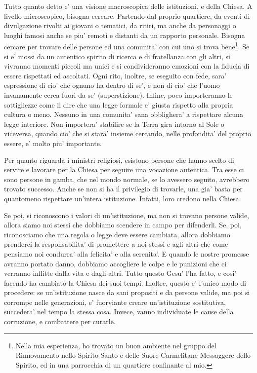 Tutto quanto detto e' una visione macroscopica delle istituzioni, e della Chiesa. A livello microscopico, bisogna cercare. Partendo dal proprio quartiere, da eventi di divulgazione rivolti ai giovani o tematici, da ritiri, ma anche da personaggi o luoghi famosi anche se piu' remoti e distanti da un rapporto personale. Bisogna cercare per trovare delle persone ed una comunita' con cui uno si trova bene\footnote{
    Nella mia esperienza, ho trovato un buon ambiente nel gruppo del Rinnovamento nello Spirito Santo e delle Suore Carmelitane Messaggere dello Spirito, ed in una parrocchia di un quartiere confinante al mio.
}.
Se si e' mossi da un autentico spirito di ricerca e di fratellanza con gli altri, si vivranno momenti piccoli ma unici e si condivideranno emozioni con la fiducia di essere rispettati ed ascoltati. Ogni rito, inoltre, se eseguito con fede, sara' espressione di cio' che ognuno ha dentro di se', e non di cio' che l'uomo invanamente cerca fuori da se' (superstizione). Infine, poco importeranno le sottigliezze come il dire che una legge formale e' giusta rispetto alla propria cultura o meno. Nessuno in una comunita' sana obblighera' a rispettare alcuna legge interiore. Non importera' stabilire se la Terra gira intorno al Sole o viceversa, quando cio' che si stara' insieme cercando, nelle profondita' del proprio essere, e' molto piu' importante.

Per quanto riguarda i ministri religiosi, esistono persone che hanno scelto di servire e lavorare per la Chiesa per seguire una vocazione autentica. Tra esse ci sono persone in gamba, che nel mondo normale, se lo avessero seguito, avrebbero trovato successo.
Anche se non si ha il privilegio di trovarle, una gia' basta per quantomeno rispettare un'intera istituzione. Infatti, loro credono nella Chiesa.

Se poi, si riconoscono i valori di un'istituzione, ma non si trovano persone valide, allora siamo noi stessi che dobbiamo scendere in campo per difenderli. Se, poi, riconosciamo che una regola o legge deve essere cambiata, allora dobbiamo prenderci la responsabilita' di promettere a noi stessi e agli altri che come pensiamo noi condurra' alla felicita' e alla serenita'. E quando le nostre promesse avranno portato danno, dobbiamo accogliere le colpe e le punizioni che ci verranno inflitte dalla vita e dagli altri. Tutto questo Gesu' l'ha fatto, e cosi' facendo ha cambiato la Chiesa dei suoi tempi. 
Inoltre, questo e' l'unico modo di procedere: se un'istituzione nasce da sani propositi e da persone valide, ma poi si corrompe nelle generazioni, e' fuorviante creare un'istituzione sostitutiva, succedera' nel tempo la stessa cosa. Invece, vanno individuate le cause della corruzione, e combattere per curarle.

